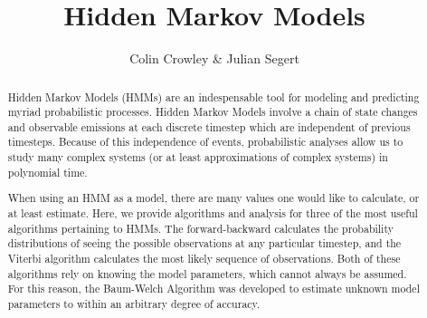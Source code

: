 \documentclass[11pt]{article}
\title{Hidden Markov Models}
\author{Colin Crowley \& Julian Segert}
\date{}
\begin{document}
\maketitle

\begin{abstract}
Hidden Markov Models (HMMs) are an indespensable tool for modeling and predicting myriad probabilistic processes. Hidden Markov Models involve a chain of state changes and observable emissions at each discrete timestep which are independent of previous timesteps. Because of this independence of events, probabilistic analyses allow us to study many complex systems (or at least approximations of complex systems) in polynomial time.

When using an HMM as a model, there are many values one would like to calculate, or at least estimate. Here, we provide algorithms and analysis for three of the most useful algorithms pertaining to HMMs. The forward-backward calculates the probability distributions of seeing the possible observations at any particular timestep, and the Viterbi algorithm calculates the most likely sequence of observations. Both of these algorithms rely on knowing the model parameters, which cannot always be assumed. For this reason, the Baum-Welch Algorithm was developed to estimate unknown model parameters to within an arbitrary degree of accuracy.
\end{abstract}




%
%
%






\appendix
%
%
\end{document}
